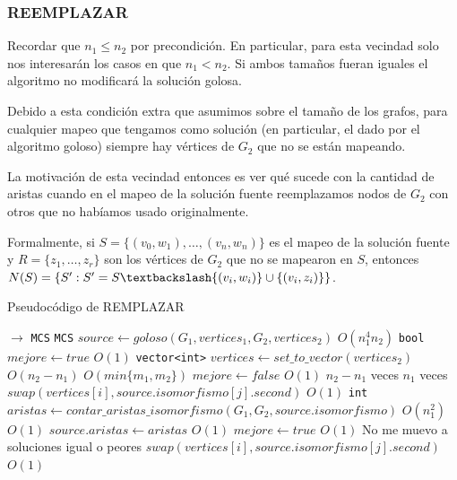 \subsubsection{REEMPLAZAR}
Recordar que $n_1 \leq n_2$ por precondición. En particular, para esta vecindad solo nos interesarán los casos en que $n_1 < n_2$. Si ambos tamaños fueran iguales el algoritmo no modificará la solución golosa.

Debido a esta condición extra que asumimos sobre el tamaño de los grafos, para cualquier mapeo que tengamos como solución (en particular, el dado por el algoritmo goloso) siempre hay vértices de $G_2$ que no se están mapeando.

La motivación de esta vecindad entonces es ver qué sucede con la cantidad de aristas cuando en el mapeo de la solución fuente reemplazamos nodos de $G_2$ con otros que no habíamos usado originalmente.

Formalmente, si $S = \{(v_0, w_{1}),\hdots , (v_n, w_{n})\}$ es el mapeo de la solución fuente y $R = \{z_1, \hdots, z_r\}$ son los vértices de $G_2$ que no se mapearon en $S$, entonces \\
$N(S) = \{S': S' = S \textbackslash \{(v_i, w_i)\} \cup \{(v_i, z_i)\}\}$. 

\begin{algorithm}[H]
  \small
  \begin{algorithmic}[1]
  \caption{Pseudocódigo de REMPLAZAR}
  \label{algo:5-2}
    $\rightarrow$ \texttt{MCS}
      \State \texttt{MCS} $source \gets goloso(G_1, vertices_1, G_2, vertices_2)$
      \Comment $O(n_1^4n_2)$
      \State \texttt{bool} $mejore \gets true$
      \Comment $O(1)$
      \State \texttt{vector<int>} $vertices \gets set\_to\_vector(vertices_2)$
      \Comment $O(n_2-n_1)$
      \Comment $O(min\{m_1, m_2\})$
        \State $mejore \gets false$
        \Comment $O(1)$
        \Comment $n_2-n_1$ veces
          \Comment $n_1$ veces
            \State $swap(vertices[i], source.isomorfismo[j].second)$
            \Comment $O(1)$
            \State \texttt{int} $aristas \gets contar\_aristas\_isomorfismo(G_1, G_2, source.isomorfismo)$
            \Comment $O(n_1^2)$
            \Comment $O(1)$
              \State $source.aristas \gets aristas$  
              \Comment $O(1)$            
              \State $mejore \gets true$
              \Comment $O(1)$
            \Else
            \Comment No me muevo a soluciones igual o peores
              \State $swap(vertices[i], source.isomorfismo[j].second)$
              \Comment $O(1)$
            \EndIf
          \EndFor
        \EndFor
      \EndWhile
    \EndProcedure
  \end{algorithmic}
\end{algorithm}

